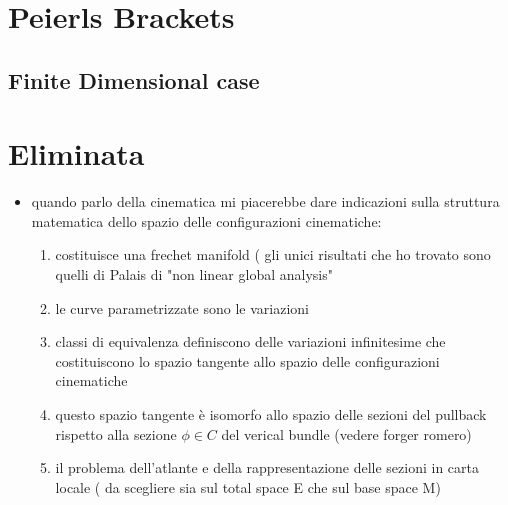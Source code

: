 \documentclass[Main]{subfiles}
\begin{document}
	\section{Peierls Brackets}
	
	\subsection{Finite Dimensional case}
	
\newpage
	\section{Eliminata}
	\begin{itemize}
		\item quando parlo della cinematica mi piacerebbe dare indicazioni sulla struttura matematica dello spazio delle configurazioni cinematiche:
			\begin{enumerate}
				\item costituisce una frechet manifold ( gli unici risultati che ho trovato sono quelli di Palais di "non linear global analysis"
				\item le curve parametrizzate sono le variazioni
				\item classi di equivalenza definiscono delle variazioni infinitesime che costituiscono lo spazio tangente allo spazio delle configurazioni cinematiche
				\item questo spazio tangente è isomorfo allo spazio delle sezioni del pullback rispetto alla sezione $\phi\in C$ del verical bundle (vedere forger romero)
				\item il problema dell'atlante e della rappresentazione delle sezioni in carta locale ( da scegliere sia sul total space E che sul base space M)
			\end{enumerate}
	\end{itemize}
	
\end{document}
